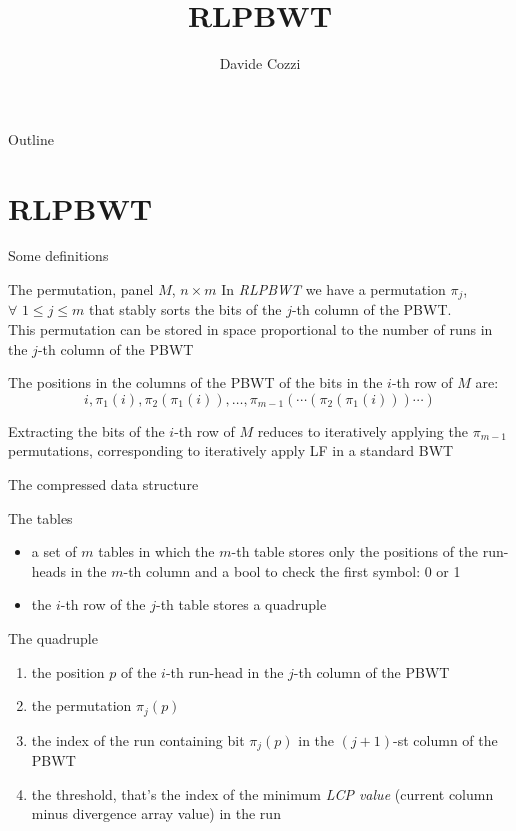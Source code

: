 \documentclass{beamer}
\title[] {RLPBWT}
\author[] {Davide Cozzi}
\institute[] {Dipartimento di Informatica, Sistemistica e Comunicazione
  (DISCo)\\
  Università degli Studi di Milano Bicocca}
\date[] {}
\begin{document}
\begin{frame}
  \titlepage
\end{frame}

\begin{frame}{Outline}
  \setcounter{tocdepth}{1}
  \tableofcontents
\end{frame}

\section{RLPBWT}
\begin{frame}{Some definitions}
  \begin{block}{The permutation, panel $M$, $n\times m$}
    In \textit{RLPBWT} we have a permutation $\pi_j$, $\forall\,\, 1\leq j\leq
    m$ that stably sorts the bits of the $j$-th column of the PBWT.\\
    This permutation can be stored in space
    proportional to the number of runs in the $j$-th column of the PBWT
  \end{block}
  \pause
  \begin{block}{}
    The positions in the columns of the PBWT of the bits in the $i$-th row of
    $M$ are:
    \pause
    \[i, \pi_1(i), \pi_2(\pi_1(i)),\ldots, \pi_{m-1}(\cdots(
      \pi_2(\pi_1(i)))\cdots)\] 
  \end{block}
  \begin{block}{}
    Extracting the bits of the $i$-th row of $M$ reduces to iteratively applying
    the $\pi_{m-1}$ permutations, corresponding to iteratively apply LF in a
    standard BWT 
  \end{block}
\end{frame}
\begin{frame}{The compressed data structure}
  \begin{block}{The tables}
    \begin{itemize}
      \item a set of $m$ tables in which the $m$-th table stores only the
      positions of the run-heads in the $m$-th column and a bool to check the
      first symbol: 0 or 1
      \item the $i$-th row of the $j$-th table stores a quadruple
    \end{itemize}    
  \end{block}
  \pause
  \begin{block}{The quadruple}
    \begin{enumerate}
      \item the position $p$ of the $i$-th run-head in the $j$-th column of the
      PBWT 
      \item the permutation $\pi_j(p)$
      \item the index of the run containing bit $\pi_j(p)$ in the $(j + 1)$-st
      column of the PBWT
      \item the threshold, that's the index of the minimum \textit{LCP value}
      (current column minus divergence array value) in the run
    \end{enumerate}
  \end{block}
\end{frame}
\end{document}
